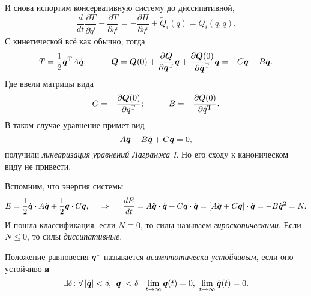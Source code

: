 И снова испортим консервативную систему до диссипативной,
\begin{equation*}
    \frac{d }{d t} \frac{\partial T}{\partial \dot{q}^i} - \frac{\partial T}{\partial q^i} = - \frac{\partial \Pi}{\partial q^i} + \tilde Q_i(\dot{q}) = Q_i(q, \dot{q}).
\end{equation*}
С кинетической всё как обычно, тогда
\begin{equation*}
    T = \frac{1}{2} \dot{\mbox{\boldmath $q$}}^{\text{T}} A \dot{\mbox{\boldmath $q$}};
    \hspace{1 cm}
    \mbox{\boldmath $Q$} = \mbox{\boldmath $Q$}(0) + \frac{\partial \mbox{\boldmath $Q$}}{\partial \mbox{\boldmath $q$}^{\text{T}}} \mbox{\boldmath $q$} + \frac{\partial \mbox{\boldmath $Q$}(0)}{\partial \dot{\mbox{\boldmath $q$}}^{\text{T}}} \dot{\mbox{\boldmath $q$}} = - C \mbox{\boldmath $q$} - B \dot{\mbox{\boldmath $q$}}.
\end{equation*}
Где ввели матрицы вида
\begin{equation*}
    C = - \frac{\partial \mbox{\boldmath $Q$}(0)}{\partial q^{\text{T}}};
    \hspace{1 cm}
    B = - \frac{\partial Q (0)}{\partial \dot{q}^{\text{T}}}.
\end{equation*}
В таком случае уравнение примет вид
\begin{equation}
    A \ddot{\mbox{\boldmath $q$}} + B \dot{\mbox{\boldmath $q$}} + C \mbox{\boldmath $q$} = 0,
\end{equation}
получили \textit{линеаризация уравнений Лагранжа I}.
Но его сходу к каноническом виду не привести.

Вспомним, что энергия системы
\begin{equation*}
    E = \frac{1}{2} \dot{\mbox{\boldmath $q$}} \cdot A \dot{\mbox{\boldmath $q$}} + \frac{1}{2} \mbox{\boldmath $q$} \cdot C \mbox{\boldmath $q$},
    \hspace{0.5cm} \Rightarrow \hspace{0.5cm}
    \frac{d E}{d t} = A \ddot{\mbox{\boldmath $q$}} \cdot \dot{\mbox{\boldmath $q$}} + C \mbox{\boldmath $q$} \cdot \dot{\mbox{\boldmath $q$}} =
    \left[
        A \ddot{\mbox{\boldmath $q$}} + C \mbox{\boldmath $q$}
    \right] \cdot \dot{\mbox{\boldmath $q$}} = - B \dot{\mbox{\boldmath $q$}}^2 = N.
\end{equation*}
И пошла классификация: если $N \equiv 0$, то силы называем \textit{гироскопическими}. Если $N \leq 0$, то силы \textit{диссипативные}. 


\begin{to_def}
    Положение равновесия $\mbox{\boldmath $q$}^*$ называется \textit{асимптотически устойчивым}, если оно устойчиво \textbf{и} 
    \begin{equation*}
        \exists \delta \colon  \forall\,  |\dot{\vc{q}}| < \delta, \, |\vc{q}| < \delta \ \ 
        \lim_{t \to \infty} \vc{q}(t) = 0, \ 
        \lim_{t \to \infty} \dot{\vc{q}}(t) = 0.
    \end{equation*}
\end{to_def}


